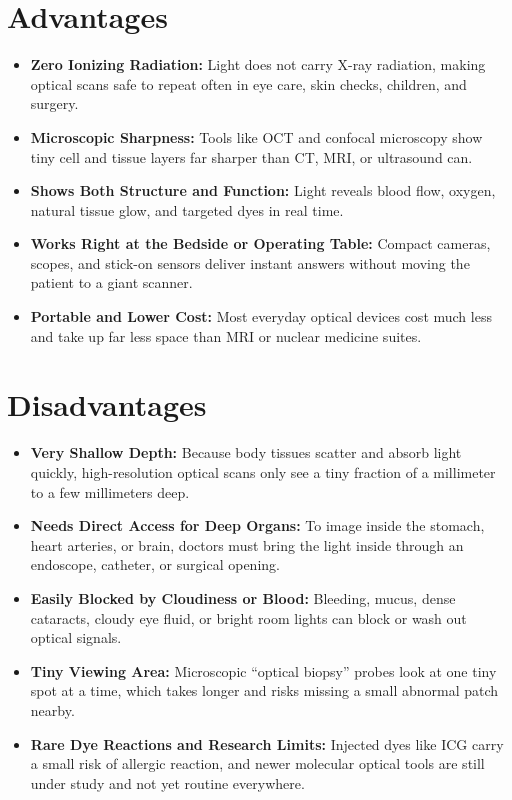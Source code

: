 \section{Advantages}
\begin{itemize}
  \item \textbf{Zero Ionizing Radiation:} Light does not carry X-ray radiation, making optical scans safe to repeat often in eye care, skin checks, children, and surgery.
  \item \textbf{Microscopic Sharpness:} Tools like OCT and confocal microscopy show tiny cell and tissue layers far sharper than CT, MRI, or ultrasound can.
  \item \textbf{Shows Both Structure and Function:} Light reveals blood flow, oxygen, natural tissue glow, and targeted dyes in real time.
  \item \textbf{Works Right at the Bedside or Operating Table:} Compact cameras, scopes, and stick-on sensors deliver instant answers without moving the patient to a giant scanner.
  \item \textbf{Portable and Lower Cost:} Most everyday optical devices cost much less and take up far less space than MRI or nuclear medicine suites.
\end{itemize}

\section{Disadvantages}
\begin{itemize}
  \item \textbf{Very Shallow Depth:} Because body tissues scatter and absorb light quickly, high-resolution optical scans only see a tiny fraction of a millimeter to a few millimeters deep.
  \item \textbf{Needs Direct Access for Deep Organs:} To image inside the stomach, heart arteries, or brain, doctors must bring the light inside through an endoscope, catheter, or surgical opening.
  \item \textbf{Easily Blocked by Cloudiness or Blood:} Bleeding, mucus, dense cataracts, cloudy eye fluid, or bright room lights can block or wash out optical signals.
  \item \textbf{Tiny Viewing Area:} Microscopic ``optical biopsy'' probes look at one tiny spot at a time, which takes longer and risks missing a small abnormal patch nearby.
  \item \textbf{Rare Dye Reactions and Research Limits:} Injected dyes like ICG carry a small risk of allergic reaction, and newer molecular optical tools are still under study and not yet routine everywhere.
\end{itemize}

